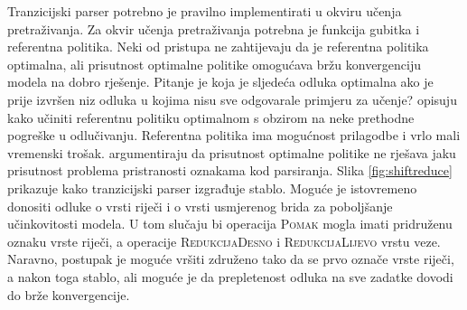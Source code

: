 Tranzicijski parser potrebno je pravilno implementirati u okviru učenja
pretraživanja. Za okvir učenja pretraživanja potrebna je funkcija gubitka i
referentna politika. Neki od pristupa ne zahtijevaju da je referentna politika
optimalna, ali prisutnost optimalne politike omogućava bržu konvergenciju modela
na dobro rješenje. Pitanje je koja je sljedeća odluka optimalna ako je prije
izvršen niz odluka u kojima nisu sve odgovarale primjeru za učenje?
\citet{goldberg2013training} opisuju kako učiniti referentnu politiku optimalnom s
obzirom na neke prethodne pogreške u odlučivanju. Referentna politika ima
mogućnost prilagodbe i vrlo mali vremenski trošak. \citet{andor2016globally}
argumentiraju da prisutnost optimalne politike ne rješava jaku prisutnost problema
pristranosti oznakama kod parsiranja. Slika \ref{fig:shiftreduce} prikazuje kako
tranzicijski parser izgrađuje stablo. Moguće je istovremeno donositi odluke o
vrsti riječi i o vrsti usmjerenog brida za poboljšanje učinkovitosti modela. U
tom slučaju bi operacija \textsc{Pomak} mogla imati pridruženu oznaku vrste
riječi, a operacije \textsc{RedukcijaDesno} i \textsc{RedukcijaLijevo} vrstu
veze. Naravno, postupak je moguće vršiti združeno tako da se prvo označe vrste
riječi, a nakon toga stablo, ali moguće je da prepletenost odluka na sve zadatke
dovodi do brže konvergencije.

